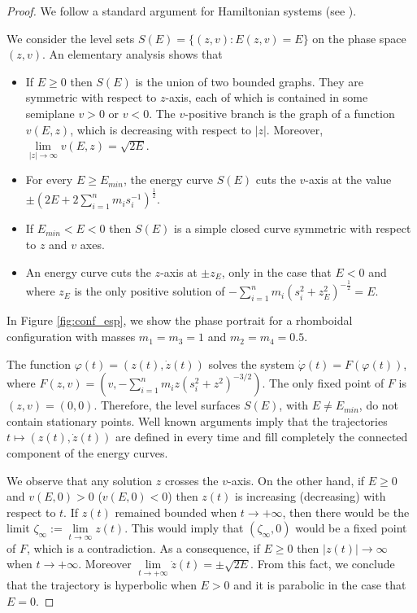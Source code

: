 \documentclass[smallcondensed]{svjour3}
\begin{document}
\begin{proof}
We follow a standard argument for Hamiltonian systems (see \cite{A}).

We consider the level sets $S(E)=\{(z,v):E(z,v)=E\}$ on the phase space $(z,v)$. An elementary analysis shows that
\begin{itemize}
 \item If $E\geq 0$ then $S(E)$ is the union of two bounded graphs. They are symmetric with respect to $z$-axis, each of which is contained  in some semiplane $v> 0$ or $v<0$. The $v$-positive branch is the graph of a function $v(E,z)$, which  is decreasing with respect to $|z|$. Moreover, $\lim\limits_{|z|\to \infty}v(E,z)=\sqrt{2E}$.

 \item For every $E\geq E_{min}$, the energy curve $S(E)$ cuts the $v$-axis at the value $\pm(2E+2\sum_{i=1}^n m_is_i^{-1})^{\frac12}$.

 \item If $E_{min}<E<0$ then $S(E)$ is a simple closed curve symmetric with respect to $z$ and $v$ axes.

 \item  An energy curve cuts the $z$-axis at $\pm z_{E}$, only in the case that $E<0$ and where $z_E$ is the only positive solution of $-\sum_{i=1}^n m_i (s_i^2+z_{E}^2)^{-\frac12}=E$.
\end{itemize}

In Figure  \ref{fig:conf_esp}, we show the phase portrait for a rhomboidal configuration with masses $m_1=m_3=1$ and $m_2=m_4=0.5$.

The function $\varphi(t)=(z(t),\dot{z}(t))$ solves the system $\dot{\varphi}(t)=F(\varphi(t))$, where \linebreak $F(z,v)=(v,-\sum_{i=1}^{n}m_iz (s_i^2+z^2)^{-3/2})$. The only fixed point of $F$ is $(z,v)=(0,0)$. Therefore, the level surfaces $S(E)$, with $E\neq E_{min}$, do not contain stationary points. Well known arguments imply that the trajectories $t\mapsto (z(t),\dot{z}(t))$ are defined in every time and   fill completely the connected component of the energy curves.

We observe that any solution $z$ crosses the $v$-axis. On the other hand, if $E\geq 0$ and $v(E,0)>0$ ($v(E,0)<0$) then $z(t)$ is increasing (decreasing) with respect to $t$. If $z(t)$ remained bounded when $t\to +\infty$, then there would be the limit $\zeta_{\infty}:=\lim\limits_{t\to\infty}z(t)$. This would imply  that $(\zeta_{\infty},0)$ would be a fixed point of $F$, which is a contradiction.  As a consequence, if $E\geq 0$ then $|z(t)|\to \infty$ when $t\to  +\infty$. Moreover $\lim\limits_{t\to +\infty}\dot{z}(t)=\pm\sqrt{2E}$.  From this fact, we conclude that the trajectory is hyperbolic when $E>0$ and it is parabolic in the case that $E=0$.


\end{proof}
\end{document}
